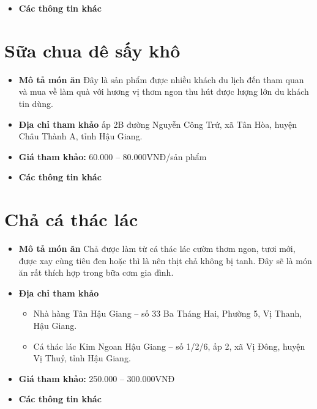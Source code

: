 \documentclass{article}
\begin{document}
\begin{itemize}
    \item{\textbf{Các thông tin khác}}
\end{itemize}

\section{Sữa chua dê sấy khô}
\begin{itemize}
    \item{\textbf{Mô tả món ăn}} Đây là sản phẩm được nhiều khách du lịch đến tham quan và mua về làm quà với hương vị thơm ngon thu hút được lượng lớn du khách tin dùng.
    \item{\textbf{Địa chỉ tham khảo}} ấp 2B đường Nguyễn Công Trứ, xã Tân Hòa, huyện Châu Thành A, tỉnh Hậu Giang.
    \item{\textbf{Giá tham khảo:}} 60.000 – 80.000VNĐ/sản phẩm
\end{itemize}

\begin{itemize}
    \item{\textbf{Các thông tin khác}}
\end{itemize}

\section{Chả cá thác lác}
\begin{itemize}
    \item{\textbf{Mô tả món ăn}} Chả được làm từ cá thác lác cườm thơm ngon, tươi mới, được xay cùng tiêu đen hoặc thì là nên thịt chả không bị tanh. Đây sẽ là món ăn rất thích hợp trong bữa cơm gia đình.
    \item{\textbf{Địa chỉ tham khảo}}
          \begin{itemize}
              \item Nhà hàng Tân Hậu Giang – số 33 Ba Tháng Hai, Phường 5, Vị Thanh, Hậu Giang.
              \item Cá thác lác Kim Ngoan Hậu Giang – số 1/2/6, ấp 2, xã Vị Đông, huyện Vị Thuỷ, tỉnh Hậu Giang.
          \end{itemize}
    \item{\textbf{Giá tham khảo:}} 250.000 – 300.000VNĐ
\end{itemize}

\begin{itemize}
    \item{\textbf{Các thông tin khác}}
\end{itemize}
\end{document}
